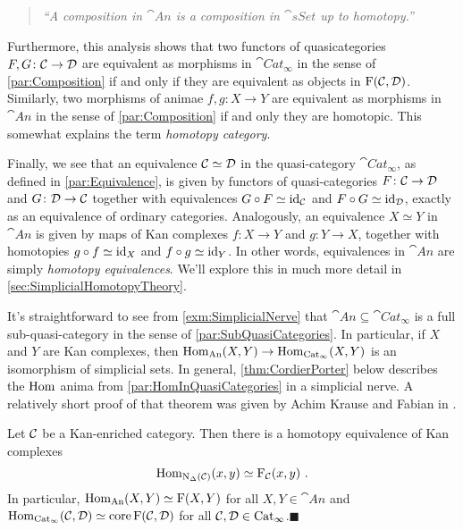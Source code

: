 \begin{exm}
\begin{quote}
		\emph{\enquote{A composition in $\cat{An}$ is a composition in $\cat{sSet}$ up to homotopy.}}
	\end{quote}
	Furthermore, this analysis shows that two functors of quasicategories $F,G\colon \mathcal{C}\rightarrow \mathcal{D}$ are equivalent as morphisms in $\cat{Cat}_\infty$ in the sense of \cref{par:Composition} if and only if they are equivalent as objects in $\operatorname{F}(\mathcal{C},\mathcal{D})$. Similarly, two morphisms of animae $f,g\colon X\rightarrow Y$ are equivalent as morphisms in $\cat{An}$ in the sense of \cref{par:Composition} if and only they are homotopic. This somewhat explains the term \emph{homotopy category}.
	
	Finally, we see that an equivalence $\mathcal{C}\simeq \mathcal{D}$ in the quasi-category $\cat{Cat}_\infty$, as defined in \cref{par:Equivalence}, is given by functors of quasi-categories $F\colon \mathcal{C}\rightarrow \mathcal{D}$ and $G\colon \mathcal{D}\rightarrow \mathcal{C}$ together with equivalences $G\circ F\simeq \operatorname{id}_{\mathcal{C}}$ and $F\circ G\simeq \operatorname{id}_{\mathcal{D}}$, exactly as an equivalence of ordinary categories. Analogously, an equivalence $X\simeq Y$ in $\cat{An}$ is given by maps of Kan complexes $f\colon X\rightarrow Y$ and $g\colon Y\rightarrow X$, together with homotopies $g\circ f\simeq\operatorname{id}_X$ and $f\circ g\simeq \operatorname{id}_Y$. In other words, equivalences in $\cat{An}$ are simply \emph{homotopy equivalences}. We'll explore this in much more detail in \cref{sec:SimplicialHomotopyTheory}.
\end{exm}
It's straightforward to see from \cref{exm:SimplicialNerve} that $\cat{An}\subseteq \cat{Cat}_\infty$ is a full sub-quasi-category in the sense of \cref{par:SubQuasiCategories}. In particular, if $X$ and $Y$ are Kan complexes, then $\operatorname{Hom}_{\mathrm{An}}(X,Y)\rightarrow\operatorname{Hom}_{\mathrm{Cat}_\infty}(X,Y)$ is an isomorphism of simplicial sets. In general, \cref{thm:CordierPorter} below describes the $\operatorname{Hom}$ anima from \cref{par:HomInQuasiCategories} in a simplicial nerve. A relatively short proof of that theorem was given by Achim Krause and Fabian in \cite{AchimFabian}.
\begin{thm}\label{thm:CordierPorter}
	Let $\mathcal{C}$ be a Kan-enriched category. Then there is a homotopy equivalence of Kan complexes
	\begin{equation*}
		\operatorname{Hom}_{\operatorname{N}_\Delta(\mathcal{C})}\!\left(x,y\right)\simeq \operatorname{F}_{\mathcal{C}}\!\left(x,y\right)\,.
	\end{equation*}
	In particular, $\operatorname{Hom}_{\mathrm{An}}(X,Y)\simeq \operatorname{F}(X,Y)$ for all $X,Y\in\cat{An}$ and $\operatorname{Hom}_{\mathrm{Cat}_\infty}(\mathcal{C},\mathcal{D})\simeq \operatorname{core}\operatorname{F}(\mathcal{C},\mathcal{D})$ for all $\mathcal{C},\mathcal{D}\in\mathrm{Cat}_\infty$.\hfill$\blacksquare$
\end{thm}

